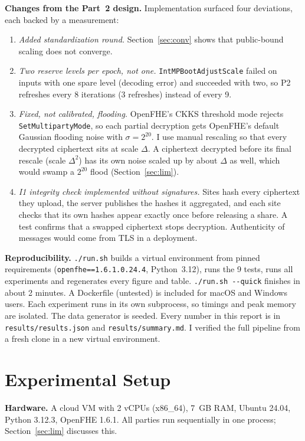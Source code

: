 \documentclass[11pt]{article}
\begin{document}
\textbf{Changes from the Part~2 design.} Implementation surfaced four deviations, each backed by a measurement:
\begin{enumerate}[label=\textbf{C\arabic*.},leftmargin=2em]
  \item \emph{Added standardization round.} Section~\ref{sec:conv} shows that public-bound scaling does not converge.
  \item \emph{Two reserve levels per epoch, not one.} \texttt{IntMPBootAdjustScale} failed on inputs with one spare level (decoding error) and succeeded with two, so P2 refreshes every 8 iterations (3 refreshes) instead of every 9.
  \item \emph{Fixed, not calibrated, flooding.} OpenFHE's CKKS threshold mode rejects \texttt{SetMultipartyMode}, so each partial decryption gets OpenFHE's default Gaussian flooding noise with $\sigma=2^{20}$. I use manual rescaling so that every decrypted ciphertext sits at scale $\Delta$. A ciphertext decrypted before its final rescale (scale $\Delta^2$) has its own noise scaled up by about $\Delta$ as well, which would swamp a $2^{20}$ flood (Section~\ref{sec:lim}).
  \item \emph{I1 integrity check implemented without signatures.} Sites hash every ciphertext they upload, the server publishes the hashes it aggregated, and each site checks that its own hashes appear exactly once before releasing a share. A test confirms that a swapped ciphertext stops decryption. Authenticity of messages would come from TLS in a deployment.
\end{enumerate}

\textbf{Reproducibility.} \texttt{./run.sh} builds a virtual environment from pinned requirements (\texttt{openfhe==1.6.1.0.24.4}, Python~3.12), runs the 9 tests, runs all experiments and regenerates every figure and table. \texttt{./run.sh -{}-quick} finishes in about 2 minutes. A Dockerfile (untested) is included for macOS and Windows users. Each experiment runs in its own subprocess, so timings and peak memory are isolated. The data generator is seeded. Every number in this report is in \texttt{results/results.json} and \texttt{results/summary.md}. I verified the full pipeline from a fresh clone in a new virtual environment.

\section{Experimental Setup}\label{sec:setup}

\textbf{Hardware.} A cloud VM with 2 vCPUs (x86\_64), 7~GB RAM, Ubuntu 24.04, Python 3.12.3, OpenFHE 1.6.1. All parties run sequentially in one process; Section~\ref{sec:lim} discusses this.
\end{document}
